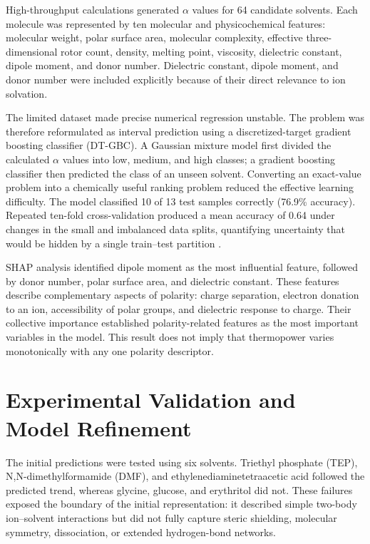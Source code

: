 \documentclass[a4paper,12pt]{report}
\begin{document}
High-throughput calculations generated $\alpha$ values for 64 candidate
solvents. Each molecule was represented by ten molecular and physicochemical
features: molecular weight, polar surface area, molecular complexity,
effective three-dimensional rotor count, density, melting point, viscosity,
dielectric constant, dipole moment, and donor number. Dielectric constant,
dipole moment, and donor number were included explicitly because of their
direct relevance to ion solvation.

The limited dataset made precise numerical regression unstable. The problem
was therefore reformulated as interval prediction using a discretized-target
gradient boosting classifier (DT-GBC). A Gaussian mixture model first divided
the calculated $\alpha$ values into low, medium, and high classes; a gradient
boosting classifier then predicted the class of an unseen solvent. Converting
an exact-value problem into a chemically useful ranking problem reduced the
effective learning difficulty. The model classified 10 of 13 test samples
correctly (76.9\% accuracy). Repeated ten-fold cross-validation produced a mean
accuracy of 0.64 under changes in the small and imbalanced data splits,
quantifying uncertainty that would be hidden by a single train--test partition
.

SHAP analysis identified dipole moment as the most influential feature,
followed by donor number, polar surface area, and dielectric constant. These
features describe complementary aspects of polarity: charge separation,
electron donation to an ion, accessibility of polar groups, and dielectric
response to charge. Their collective importance established polarity-related
features as the most important variables in the model. This result does not
imply that thermopower varies monotonically with any one polarity descriptor.

\section{Experimental Validation and Model Refinement}

The initial predictions were tested using six solvents. Triethyl phosphate
(TEP), N,N-dimethylformamide (DMF), and
ethylenediaminetetraacetic acid followed the predicted trend, whereas glycine,
glucose, and erythritol did not. These failures exposed the boundary of the
initial representation: it described simple two-body ion--solvent interactions
but did not fully capture steric shielding, molecular symmetry, dissociation,
or extended hydrogen-bond networks.
\end{document}
